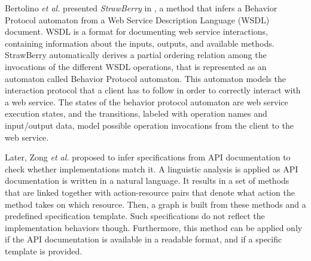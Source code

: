 Bertolino \emph{et al.} presented \textit{StrawBerry} in
\cite{Bertolino:2009:ASB:1595696.1595719}, a method that infers a
Behavior Protocol automaton from a Web Service Description
Language (WSDL) document.  WSDL is a format for documenting web
service interactions, containing information about the inputs,
outputs, and available methods. StrawBerry automatically derives a
partial ordering relation among the invocations of the different
WSDL operations, that is represented as an automaton called
Behavior Protocol automaton.  This automaton models the
interaction protocol that a client has to follow in order to
correctly interact with a web service.  The states of the
behavior protocol automaton are web service execution states, and
the transitions, labeled with operation names and input/output
data, model possible operation invocations from the client to the
web service.

Later, Zong \emph{et al.} \cite{ZhongZXM11} proposed to infer
specifications from API documentation to check whether
implementations match it. A linguistic analysis is applied as API
documentation is written in a natural language. It results in a
set of methods that are linked together with action-resource
pairs that denote what action the method takes on which resource.
Then, a graph is built from these methods and a predefined
specification template. Such specifications do not reflect the
implementation behaviors though. Furthermore, this method can be
applied only if the API documentation is available in a readable
format, and if a specific template is provided.
